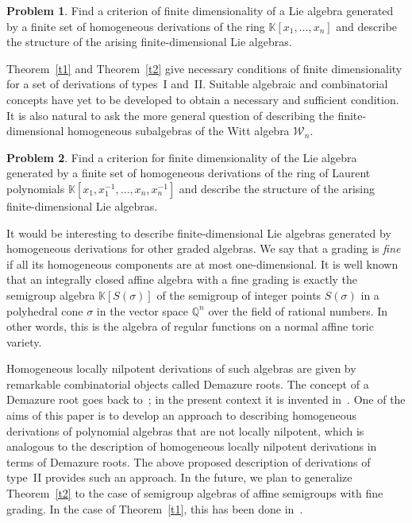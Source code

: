 \documentclass[a4paper, 12pt,oneside,reqno]{amsart}
\numberwithin{equation}{section}
\theoremstyle{definition}
\newtheorem{problem}{Problem}
\begin{document}
{\begin{problem}
Find a criterion of finite dimensionality of a Lie algebra generated by a finite set of homogeneous derivations of the ring $\mathbb{K}[x_1,\ldots,x_n]$ and describe the structure of the arising finite-dimensional Lie algebras. 
\end{problem}

Theorem~\ref{t1} and Theorem~\ref{t2} give necessary conditions of finite dimensionality for a set of derivations of types~I and~II. Suitable algebraic and combinatorial concepts have yet to be developed to obtain a necessary and sufficient condition. It is also natural to ask the more general question of describing the finite-dimensional homogeneous subalgebras of the Witt algebra $\mathcal{W}_n$. 

\begin{problem}
Find a criterion for finite dimensionality of the Lie algebra generated by a finite set of homogeneous derivations of the ring of Laurent polynomials $\mathbb{K}[x_1,x_1^{-1},\ldots,x_n,x_n^{-1}]$ and describe the structure of the arising finite-dimensional Lie algebras.
\end{problem}

It would be interesting to describe finite-dimensional Lie algebras generated by homogeneous derivations for other graded algebras. We say that a grading is \emph{fine} if all its homogeneous components are at most one-dimensional. It is well known that an integrally closed affine algebra with a fine grading is exactly the semigroup algebra $\mathbb{K}[S(\sigma)]$ of the semigroup of integer points $S(\sigma)$ in a polyhedral cone $\sigma$ in the vector space $\mathbb{Q}^n$ over the field of rational numbers. In other words, this is the algebra of regular functions on a normal affine toric variety. 

Homogeneous locally nilpotent derivations of such algebras are given by remarkable combinatorial objects called Demazure roots. The concept of a Demazure root goes back to~\cite{De}; in the present context it is invented in~\cite{Li1,Li2}. One of the aims of this paper is to develop an approach to describing homogeneous derivations of polynomial algebras that are not locally nilpotent, which is analogous to the description of homogeneous locally nilpotent derivations in terms of Demazure roots. The above proposed description of derivations of type~II provides such an approach. In the future, we plan to generalize Theorem~\ref{t2} to the case of semigroup algebras of affine semigroups with fine grading. In the case of Theorem~\ref{t1}, this has been done in~\cite{ALS, AZ}.  

}
\end{document}

